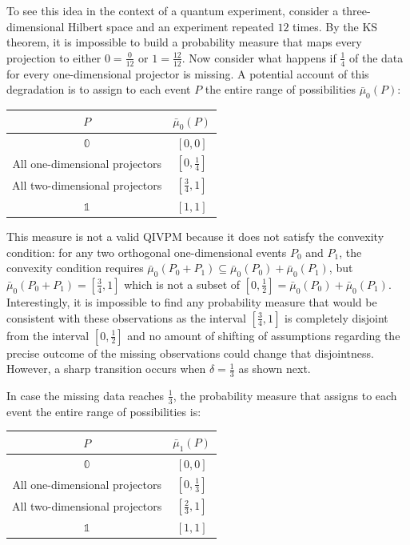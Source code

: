 \documentclass[english,reprint, aps, prl,superscriptaddress, showpacs,
showkeys, longbibliography, amsmath, amssymb, floatfix]{revtex4-1}
\theoremstyle{plain}
\theoremstyle{definition}
\newcommand{\imposs}{\ensuremath{\left[0,0\right]}}
\newcommand{\necess}{\ensuremath{\left[1,1\right]}}
\begin{document}
To see this idea in the context of a quantum experiment, consider a
three-dimensional Hilbert space and an experiment repeated $12$
times. By the KS theorem, it is impossible to build a probability
measure that maps every projection to either $0=\frac{0}{12}$ or
$1=\frac{12}{12}$. Now consider what happens if $\frac{1}{4}$ of the
data for every one-dimensional projector is missing. A potential
account of this degradation is to assign to each event $P$ the entire
range of possibilities $\bar{\mu}_{0}(P)$:
\begin{center}
\begin{tabular}{cc}
\toprule 
\addlinespace
$P$  & $\bar{\mu}_{0}\left(P\right)$\tabularnewline
\midrule
\midrule 
\addlinespace
$\mathbb{0}$  & $\imposs$\tabularnewline
\midrule 
\addlinespace
All one-dimensional projectors  & $\left[0,\tfrac{1}{4}\right]$\tabularnewline
\midrule 
\addlinespace
All two-dimensional projectors  & $\left[\tfrac{3}{4},1\right]$\tabularnewline
\midrule 
\addlinespace
$\mathbb{1}$  & $\necess$\tabularnewline
\bottomrule
\end{tabular}
\par\end{center}

\noindent This measure is not a valid QIVPM because it does not satisfy
the convexity condition: for any two orthogonal one-dimensional events
$P_{0}$ and $P_{1}$, the convexity condition requires $\bar{\mu}_{0}\left(P_{0}+P_{1}\right)\subseteq\bar{\mu}_{0}\left(P_{0}\right)+\bar{\mu}_{0}\left(P_{1}\right)$,
but $\bar{\mu}_{0}\left(P_{0}+P_{1}\right)=\left[\tfrac{3}{4},1\right]$
which is not a subset of $\left[0,\tfrac{1}{2}\right]=\bar{\mu}_{0}\left(P_{0}\right)+\bar{\mu}_{0}\left(P_{1}\right)$.
Interestingly, it is impossible to find any probability measure that
would be consistent with these observations as the interval $\left[\tfrac{3}{4},1\right]$
is completely disjoint from the interval $\left[0,\tfrac{1}{2}\right]$
and no amount of shifting of assumptions regarding the precise outcome
of the missing observations could change that disjointness. However,
a sharp transition occurs when $\delta=\tfrac{1}{3}$ as shown next.

In case the missing data reaches $\frac{1}{3}$, the probability measure
that assigns to each event the entire range of possibilities is: 
\begin{center}
\begin{tabular}{cc}
\toprule 
\addlinespace
$P$  & $\bar{\mu}_{1}\left(P\right)$\tabularnewline
\midrule
\midrule 
\addlinespace
$\mathbb{0}$  & $\imposs$\tabularnewline
\midrule 
\addlinespace
All one-dimensional projectors  & $\left[0,\tfrac{1}{3}\right]$\tabularnewline
\midrule 
\addlinespace
All two-dimensional projectors  & $\left[\tfrac{2}{3},1\right]$\tabularnewline
\midrule 
\addlinespace
$\mathbb{1}$  & $\necess$\tabularnewline
\bottomrule
\end{tabular}
\par\end{center}
\end{document}
